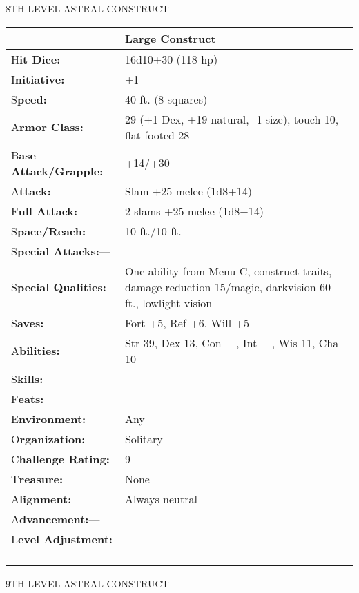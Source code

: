 \documentclass{article}
\begin{document}
\vspace{12pt}
{\LARGE{}8TH-LEVEL ASTRAL CONSTRUCT}

\begin{tabular}{|>{\raggedright}p{90pt}|>{\raggedright}p{236pt}|}
\hline
  & Large Construct\tabularnewline
\hline
H\textbf{it Dice:} & 16d10+30 (118 hp)\tabularnewline
\hline
I\textbf{nitiative:} & +1\tabularnewline
\hline
S\textbf{peed:} & 40 ft. (8 squares)\tabularnewline
\hline
A\textbf{rmor Class:} & 29 (+1 Dex, +19 natural, -1 size), touch 10, flat-footed 
28\tabularnewline
\hline
B\textbf{ase Attack/Grapple:} & +14/+30\tabularnewline
\hline
A\textbf{ttack:} & Slam +25 melee (1d8+14)\tabularnewline
\hline
F\textbf{ull Attack:} & 2 slams +25 melee (1d8+14)\tabularnewline
\hline
S\textbf{pace/Reach:} & 10 ft./10 ft.\tabularnewline
\hline
S\textbf{pecial Attacks:}--- & \tabularnewline
\hline
S\textbf{pecial Qualities:} & One ability from Menu C, construct traits, damage 
reduction 15/magic, darkvision 60 ft., lowlight vision\tabularnewline
\hline
S\textbf{aves:} & Fort +5, Ref +6, Will +5\tabularnewline
\hline
A\textbf{bilities:} & Str 39, Dex 13, Con ---, Int ---, Wis 11, Cha 10\tabularnewline
\hline
S\textbf{kills:}--- & \tabularnewline
\hline
F\textbf{eats:}--- & \tabularnewline
\hline
E\textbf{nvironment:} & Any\tabularnewline
\hline
O\textbf{rganization:} & Solitary\tabularnewline
\hline
C\textbf{hallenge Rating:} & 9\tabularnewline
\hline
T\textbf{reasure:} & None\tabularnewline
\hline
A\textbf{lignment:} & Always neutral\tabularnewline
\hline
A\textbf{dvancement:}--- & \tabularnewline
\hline
L\textbf{evel Adjustment:}--- & \tabularnewline
\hline
\end{tabular}

\vspace{12pt}
{\LARGE{}9TH-LEVEL ASTRAL CONSTRUCT}
\end{document}
